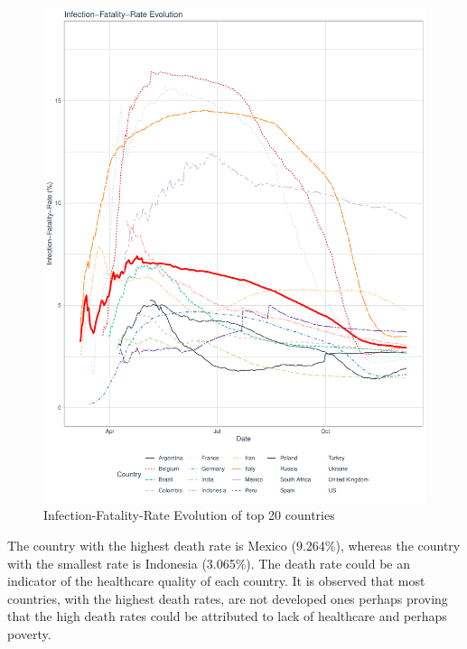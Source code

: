 \begin{figure}[!h]
    \centering
    \includegraphics[width=\linewidth]{images/infection_fertility_evolution.pdf}
    \caption{Infection-Fatality-Rate Evolution of top 20 countries}
    \label{fig:top_20_countries}
\end{figure}

The country with the highest death rate is Mexico (9.264\%), whereas the country with the smallest rate is Indonesia (3.065\%). The death rate could be an indicator of the healthcare quality of each country. It is observed that most countries, with the highest death rates, are not developed ones perhaps proving that the high death rates could be attributed to lack of healthcare and perhaps poverty.
